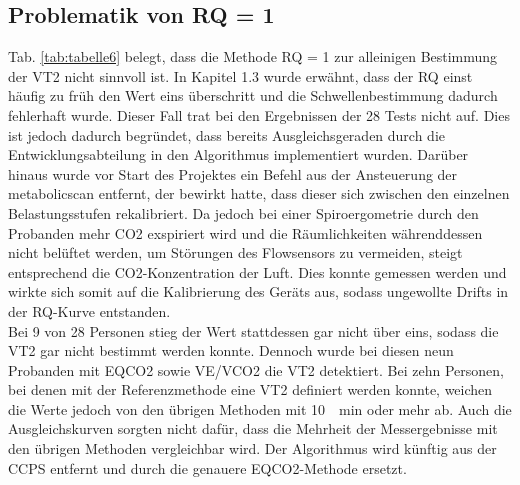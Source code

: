 \subsection{Problematik von RQ = 1}
%
Tab. \ref{tab:tabelle6} belegt, dass die Methode RQ = 1 zur alleinigen Bestimmung der VT2 nicht sinnvoll ist. In Kapitel 1.3 wurde erwähnt, dass der RQ einst häufig zu früh den Wert eins überschritt und die Schwellenbestimmung dadurch fehlerhaft wurde. Dieser Fall trat bei den Ergebnissen der 28 Tests nicht auf. Dies ist jedoch dadurch begründet, dass bereits Ausgleichsgeraden durch die Entwicklungsabteilung in den Algorithmus implementiert wurden. Darüber hinaus wurde vor Start des Projektes ein Befehl aus der Ansteuerung der metabolicscan entfernt, der bewirkt hatte, dass dieser sich zwischen den einzelnen Belastungsstufen rekalibriert. Da jedoch bei einer Spiroergometrie durch den Probanden mehr \gls{CO2} exspiriert wird und die Räumlichkeiten währenddessen nicht belüftet werden, um Störungen des Flowsensors zu vermeiden, steigt entsprechend die \gls{CO2}-Konzentration der Luft. Dies konnte gemessen werden und wirkte sich somit auf die Kalibrierung des Geräts aus, sodass ungewollte Drifts in der RQ-Kurve entstanden.\\
Bei 9 von 28 Personen stieg der Wert stattdessen gar nicht über eins, sodass die VT2 gar nicht bestimmt werden konnte. Dennoch wurde bei diesen neun Probanden mit \gls{EQCO2} sowie \gls{VE}/\gls{VCO2} die VT2 detektiert. Bei zehn Personen, bei denen mit der Referenzmethode eine VT2 definiert werden konnte, weichen die Werte jedoch von den übrigen Methoden mit \SI{10}{\per\minute} oder mehr ab. Auch die Ausgleichskurven sorgten nicht dafür, dass die Mehrheit der Messergebnisse mit den übrigen Methoden vergleichbar wird. Der Algorithmus wird künftig aus der \gls{CCPS} entfernt und durch die genauere \gls{EQCO2}-Methode ersetzt.
%
